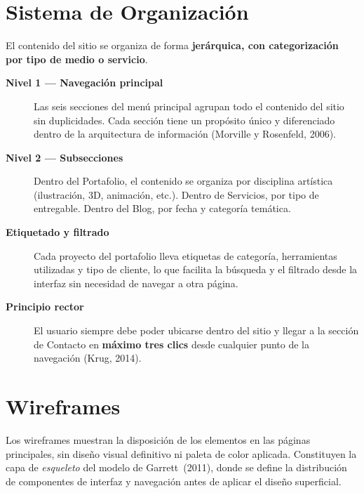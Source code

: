 \documentclass[12pt, letterpaper]{article}
\begin{document}
\section{Sistema de Organización}

El contenido del sitio se organiza de forma \textbf{jerárquica, con categorización por tipo de medio o servicio}.

\begin{description}
  \item[\textbf{\color{luluPurple}Nivel 1 — Navegación principal}]
  Las seis secciones del menú principal agrupan todo el contenido del sitio sin duplicidades. Cada sección tiene un propósito único y diferenciado dentro de la arquitectura de información (Morville y Rosenfeld, 2006).

  \item[\textbf{\color{luluPurple}Nivel 2 — Subsecciones}]
  Dentro del Portafolio, el contenido se organiza por disciplina artística (ilustración, 3D, animación, etc.). Dentro de Servicios, por tipo de entregable. Dentro del Blog, por fecha y categoría temática.

  \item[\textbf{\color{luluPurple}Etiquetado y filtrado}]
  Cada proyecto del portafolio lleva etiquetas de categoría, herramientas utilizadas y tipo de cliente, lo que facilita la búsqueda y el filtrado desde la interfaz sin necesidad de navegar a otra página.

  \item[\textbf{\color{luluPurple}Principio rector}]
  El usuario siempre debe poder ubicarse dentro del sitio y llegar a la sección de Contacto en \textbf{máximo tres clics} desde cualquier punto de la navegación (Krug, 2014).
\end{description}


\section{Wireframes}

Los wireframes muestran la disposición de los elementos en las páginas principales, sin diseño visual definitivo ni paleta de color aplicada. Constituyen la capa de \textit{esqueleto} del modelo de Garrett~(2011), donde se define la distribución de componentes de interfaz y navegación antes de aplicar el diseño superficial.
\end{document}
